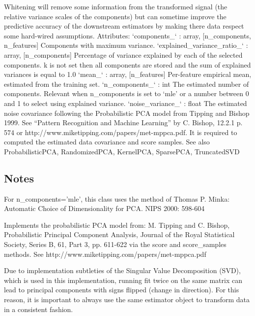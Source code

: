 Whitening will remove some information from the transformed signal (the relative variance scales of the components) but can sometime improve the predictive accuracy of the downstream estimators by making there data respect some hard-wired assumptions.
Attributes:	
`components_` : array, [n_components, n_features]
Components with maximum variance.
`explained_variance_ratio_` : array, [n_components]
Percentage of variance explained by each of the selected components. k is not set then all components are stored and the sum of explained variances is equal to 1.0
`mean_` : array, [n_features]
Per-feature empirical mean, estimated from the training set.
`n_components_` : int
The estimated number of components. Relevant when n_components is set to ‘mle’ or a number between 0 and 1 to select using explained variance.
`noise_variance_` : float
The estimated noise covariance following the Probabilistic PCA model from Tipping and Bishop 1999. See “Pattern Recognition and Machine Learning” by C. Bishop, 12.2.1 p. 574 or http://www.miketipping.com/papers/met-mppca.pdf. It is required to computed the estimated data covariance and score samples.
See also ProbabilisticPCA, RandomizedPCA, KernelPCA, SparsePCA, TruncatedSVD
\subsection*{Notes}
For n_components=’mle’, this class uses the method of Thomas P. Minka: Automatic Choice of Dimensionality for PCA. NIPS 2000: 598-604

Implements the probabilistic PCA model from: M. Tipping and C. Bishop, Probabilistic Principal Component Analysis, Journal of the Royal Statistical Society, Series B, 61, Part 3, pp. 611-622 via the score and score_samples methods. See http://www.miketipping.com/papers/met-mppca.pdf

Due to implementation subtleties of the Singular Value Decomposition (SVD), which is used in this implementation, running fit twice on the same matrix can lead to principal components with signs flipped (change in direction). For this reason, it is important to always use the same estimator object to transform data in a consistent fashion.
